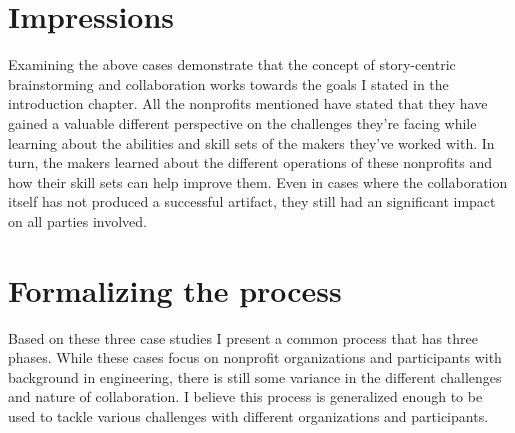 \section{Impressions}

Examining the above cases demonstrate that the concept of story-centric brainstorming and collaboration works towards the goals I stated in the introduction chapter. All the nonprofits mentioned have stated that they have gained a valuable different perspective on the challenges they're facing while learning about the abilities and skill sets of the makers they've worked with. In turn, the makers learned about the different operations of these nonprofits and how their skill sets can help improve them. Even in cases where the collaboration itself has not produced a successful artifact, they still had an significant impact on all parties involved. 

\section{Formalizing the process}

Based on these three case studies I present a common process that has three phases. While these cases focus on nonprofit organizations and participants with background in engineering, there is still some variance in the different challenges and nature of collaboration. I believe this process is generalized enough to be used to tackle various challenges with different organizations and participants. 

